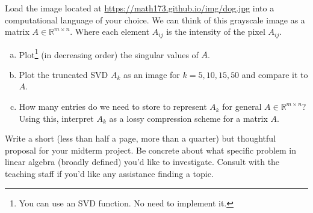 \documentclass[12pt,letterpaper,cm]{hmcpset}
\begin{document}
\begin{problem}[5]
    Load the image located at \url{https://math173.github.io/img/dog.jpg} into a computational language of your choice.
    We can think of this grayscale image as a matrix $A\in\mathbb{R}^{m\times n}$. Where each element $A_{ij}$ is
    the intensity of the pixel $A_{ij}$.
\begin{enumerate}[(a)]
    \item Plot\footnote{You can use an SVD function. No need to implement it.} (in decreasing order) the singular values of $A$.
    \item Plot the truncated SVD $A_k$ as an image for $k=5,10,15,50$ and compare it to $A$.
    \item How many entries do we need to store to represent $A_k$ for general $A\in\mathbb{R}^{m\times n}$?
        Using this, interpret $A_k$ as a lossy compression scheme for a matrix $A$.
\end{enumerate}
\end{problem}

\begin{solution}
    \vfill
\end{solution}
\clearpage

\begin{problem}
    Write a short (less than half a page, more than a quarter) but thoughtful proposal
    for your midterm project. Be concrete about what specific problem in linear algebra
    (broadly defined) you'd like to investigate.
    Consult with the teaching staff if you'd like any assistance finding a topic.
\end{problem}

\begin{solution}
    \vfill
\end{solution}
\end{document}
